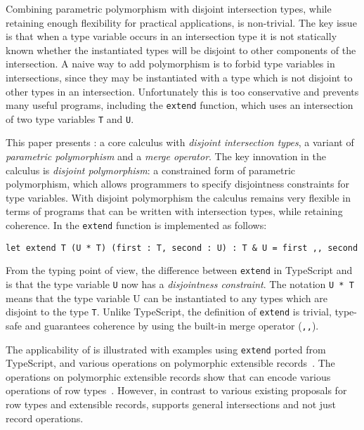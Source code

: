 Combining parametric polymorphism with disjoint intersection
types, while retaining enough flexibility for practical applications,
is non-trivial. The key issue is that when a type variable occurs in an intersection
type it is not statically known whether the instantiated types will
be disjoint to other components of the intersection.
A naive way  to add polymorphism is to forbid 
type variables in intersections, since they may be instantiated with 
a type which is not disjoint to other types in an intersection.
Unfortunately this is too conservative and prevents many useful 
programs, including the \lstinline{extend} function, which uses an
intersection of two type variables \lstinline{T} and \lstinline{U}. 


This paper presents \name: a core calculus with 
\emph{disjoint intersection types}, a variant of \emph{parametric polymorphism} and a
\emph{merge operator}. The key innovation in the calculus is \emph{disjoint polymorphism}: a
constrained form of parametric polymorphism, which allows programmers
to specify disjointness constraints for type variables. With disjoint
polymorphism the calculus remains very flexible in terms of programs
that can be written with intersection types, while retaining
coherence. In \name the \lstinline{extend} function is implemented
as follows:

\begin{lstlisting}
let extend T (U * T) (first : T, second : U) : T & U = first ,, second 
\end{lstlisting}

\noindent From the typing point of view, the difference between
\lstinline{extend} in TypeScript and \name is that the type variable
\lstinline{U} now has a \emph{disjointness constraint}. The notation
\lstinline{U * T} means that the type variable U can be instantiated
to any types which are disjoint to the type \lstinline{T}. Unlike
TypeScript, the definition of \lstinline{extend} is trivial, type-safe
and guarantees coherence by using the built-in merge operator (\lstinline{,,}). 

The applicability of \name is illustrated with examples using \lstinline{extend} 
ported from TypeScript, and various operations on polymorphic
extensible records~\cite{leijen2005extensible,harper1991record,jones99lightweight}. 
The operations on polymorphic extensible records
show that \name can encode various operations of row
types~\cite{wand1987complete}. However, in contrast to various existing proposals for 
row types and extensible records, \name supports general intersections 
and not just record operations.

